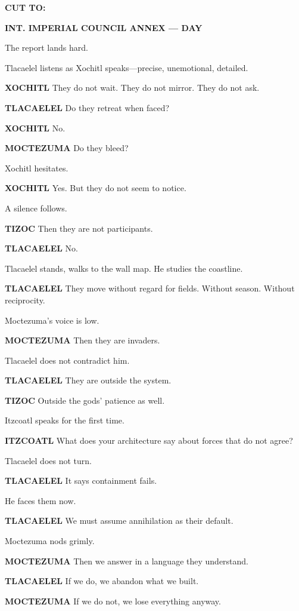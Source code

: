\documentclass[12pt]{article}
\begin{document}
\textbf{CUT TO:}

\textbf{INT. IMPERIAL COUNCIL ANNEX — DAY}

The report lands hard.

Tlacaelel listens as Xochitl speaks—precise, unemotional, detailed.

\textbf{XOCHITL}  
They do not wait.  
They do not mirror.  
They do not ask.

\textbf{TLACAELEL}  
Do they retreat when faced?

\textbf{XOCHITL}  
No.

\textbf{MOCTEZUMA}  
Do they bleed?

Xochitl hesitates.

\textbf{XOCHITL}  
Yes.  
But they do not seem to notice.

A silence follows.

\textbf{TIZOC}  
Then they are not participants.

\textbf{TLACAELEL}  
No.

Tlacaelel stands, walks to the wall map. He studies the coastline.

\textbf{TLACAELEL}  
They move without regard for fields.  
Without season.  
Without reciprocity.

Moctezuma’s voice is low.

\textbf{MOCTEZUMA}  
Then they are invaders.

Tlacaelel does not contradict him.

\textbf{TLACAELEL}  
They are outside the system.

\textbf{TIZOC}  
Outside the gods’ patience as well.

Itzcoatl speaks for the first time.

\textbf{ITZCOATL}  
What does your architecture say  
about forces that do not agree?

Tlacaelel does not turn.

\textbf{TLACAELEL}  
It says containment fails.

He faces them now.

\textbf{TLACAELEL}  
We must assume annihilation  
as their default.

Moctezuma nods grimly.

\textbf{MOCTEZUMA}  
Then we answer in a language they understand.

\textbf{TLACAELEL}  
If we do, we abandon what we built.

\textbf{MOCTEZUMA}  
If we do not, we lose everything anyway.
\end{document}

